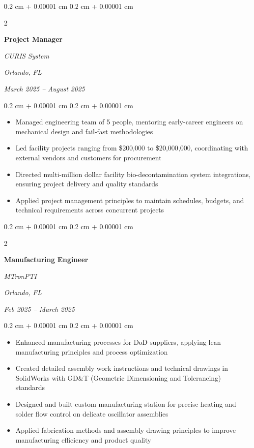 \documentclass[10pt, letterpaper]{article}
\newenvironment{highlights}{
    \begin{itemize}[
        topsep=0.10 cm,
        parsep=0.10 cm,
        partopsep=0pt,
        itemsep=0pt,
        leftmargin=0.4 cm + 10pt
    ]
}{
    \end{itemize}
} %
\newenvironment{onecolentry}{
    \begin{adjustwidth}{
        0.2 cm + 0.00001 cm
    }{
        0.2 cm + 0.00001 cm
    }
}{
    \end{adjustwidth}
} %
\newenvironment{twocolentry}[2][]{
    \onecolentry
    \def\secondColumn{#2}
    \setcolumnwidth{\fill, 9.0 cm}
    \begin{paracol}{2}
}{
    \switchcolumn \raggedleft \secondColumn
    \end{paracol}
    \endonecolentry
} %
\begin{document}
        \vspace{0.35 cm}

        
        \begin{twocolentry}{
        \textit{Orlando, FL}    
            
        \textit{March 2025 – August 2025}}
            \textbf{Project Manager}
            
            \textit{CURIS System}
        \end{twocolentry}

        \vspace{0.10 cm}
        \begin{onecolentry}
            \begin{highlights}
                \item Managed engineering team of 5 people, mentoring early-career engineers on mechanical design and fail-fast methodologies
                \item Led facility projects ranging from \$200,000 to \$20,000,000, coordinating with external vendors and customers for procurement
                \item Directed multi-million dollar facility bio-decontamination system integrations, ensuring project delivery and quality standards
                \item Applied project management principles to maintain schedules, budgets, and technical requirements across concurrent projects
            \end{highlights}
        \end{onecolentry}


        \vspace{0.35 cm}

        \begin{twocolentry}{
        \textit{Orlando, FL}    
            
        \textit{Feb 2025 – March 2025}}
            \textbf{Manufacturing Engineer}
            
            \textit{MTronPTI}
        \end{twocolentry}

        \vspace{0.10 cm}
        \begin{onecolentry}
            \begin{highlights}
                \item Enhanced manufacturing processes for DoD suppliers, applying lean manufacturing principles and process optimization
                \item Created detailed assembly work instructions and technical drawings in SolidWorks with GD\&T (Geometric Dimensioning and Tolerancing) standards
                \item Designed and built custom manufacturing station for precise heating and solder flow control on delicate oscillator assemblies
                \item Applied fabrication methods and assembly drawing principles to improve manufacturing efficiency and product quality
            \end{highlights}
        \end{onecolentry}
\end{document}
